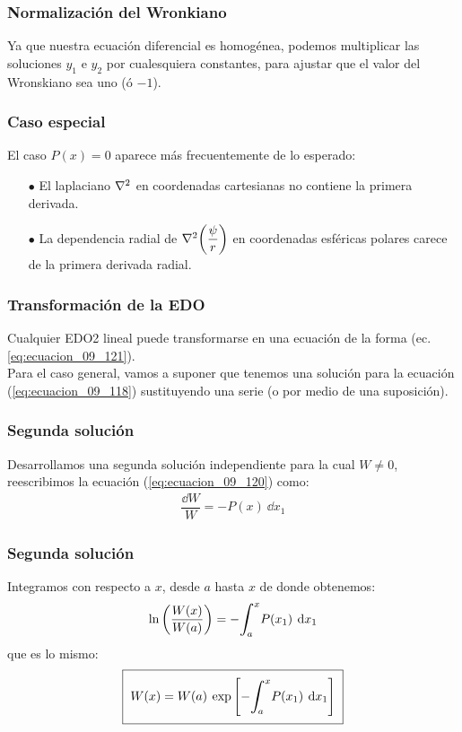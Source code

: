 \documentclass[12pt]{beamer}
\begin{document}
\begin{frame}
\frametitle{Normalización del Wronkiano}
Ya que nuestra ecuación diferencial es homogénea, podemos multiplicar las soluciones $y_{1}$ e $y_{2}$ por cualesquiera constantes, para ajustar que el valor del Wronskiano sea uno (ó $-1$).
\end{frame}
\begin{frame}
\frametitle{Caso especial}
El caso $P (x) = 0$ aparece más frecuentemente de lo esperado:
\pause
\begin{itemize}[<+->]
\item[\textcolor{ao}{$\bullet$}] El laplaciano $\laplacian$ en coordenadas cartesianas no contiene la primera derivada.
\item[\textcolor{ao}{$\bullet$}] La dependencia radial de $\laplacian (\dfrac{\psi}{r})$ en coordenadas esféricas polares carece de la primera derivada radial.
\end{itemize}
\end{frame}
\begin{frame}
\frametitle{Transformación de la EDO}
Cualquier EDO2 lineal puede transformarse en una ecuación de la forma (ec. \ref{eq:ecuacion_09_121}).
\\
\bigskip
\pause
Para el caso general, vamos a suponer que tenemos una solución para la ecuación (\ref{eq:ecuacion_09_118}) sustituyendo una serie (o por medio de una suposición). 
\end{frame}
\begin{frame}
\frametitle{Segunda solución}
Desarrollamos una segunda solución independiente para la cual $W \neq 0$, reescribimos la ecuación (\ref{eq:ecuacion_09_120}) como:
\pause
\begin{align*}
\dfrac{\dd{W}}{W} = - P(x) \: \dd{x_{1}}
\end{align*}
\end{frame}
\begin{frame}
\frametitle{Segunda solución}
Integramos con respecto a $x$, desde $a$ hasta $x$ de donde obtenemos:
\pause
\begin{align*}
\ln \left( \dfrac{W (x)}{W (a)} \right) = - \scaleint{6ex}_{\bs a}^{x} P (x_{1}) \: \dd{x_{1}}
\end{align*}
\pause
que es lo mismo:
\begin{align}
\setlength{\fboxsep}{2\fboxsep}\boxed{W (x) = W (a) \: \exp \left[ - \scaleint{6ex}_{\bs a}^{x} P (x_{1}) \: \dd{x_{1}} \right]}
\label{eq:ecuacion_09_123}
\end{align}
\end{frame}
\end{document}

